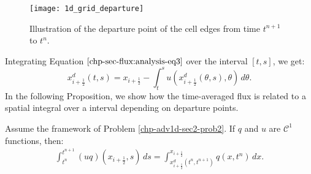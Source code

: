 \begin{figure}[!htb]
	\centering
	\texttt{[image: 1d\_grid\_departure]}
	\caption{Illustration of the departure point of the cell edges from time $t^{n+1}$ to $t^n$.\label{chp-adv1d-sec1-grid1d-dep}}
\end{figure}
Integrating Equation $\eqref{chp-sec-flux:analysis-eq3}$ over the interval
$[t,s]$, we get:
\begin{equation}
	\label{chp-sec-flux:analysis-eq4}
	x^d_{i+\frac{1}{2}} (t,s) = x_{i+\frac{1}{2}} - \int_{t}^{s}u(x^d_{i+\frac{1}{2}}(\theta,s),\theta)  \,d\theta.
\end{equation}
In the following Proposition, we show how the time-averaged flux is 
related to a spatial integral over a interval depending on departure points.
\begin{prop}
	\label{chp-adv1d-sec-flux:prop1}
	Assume the framework of Problem \ref{chp-adv1d-sec2-prob2}.
	If $q$ and $u$ are $\mathcal{C}^1$ functions, then:
	\begin{align}
		\label{chp-adv1d-sec-flux:approx1}
		\int_{t^n}^{t^{n+1}} (uq)(x_{i+\frac{1}{2}},s) \,ds = 
		\int^{x_{i+\frac{1}{2}}}_{x^d_{i+\frac{1}{2}}(t^n,t^{n+1})} q(x,t^n)\,dx.
	\end{align}
\end{prop}
